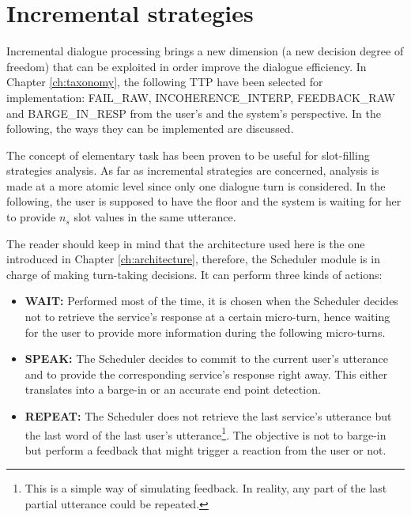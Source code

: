 \section{Incremental strategies}
\label{sec:incrstrat}

     Incremental dialogue processing brings a new dimension (a new decision degree of freedom) that can be exploited in order improve the dialogue efficiency. In Chapter \ref{ch:taxonomy}, the following TTP have been selected for implementation: FAIL\_RAW, INCOHERENCE\_INTERP, FEEDBACK\_RAW and BARGE\_IN\_RESP from the user's and the system's perspective. In the following, the ways they can be implemented are discussed.

     The concept of elementary task has been proven to be useful for slot-filling strategies analysis. As far as incremental strategies are concerned, analysis is made at a more atomic level since only one dialogue turn is considered. In the following, the user is supposed to have the floor and the system is waiting for her to provide $n_s$ slot values in the same utterance.

     The reader should keep in mind that the architecture used here is the one introduced in Chapter \ref{ch:architecture}, therefore, the Scheduler module is in charge of making turn-taking decisions. It can perform three kinds of actions:

     \begin{itemize}
       \item \textbf{WAIT:} Performed most of the time, it is chosen when the Scheduler decides not to retrieve the service's response at a certain micro-turn, hence waiting for the user to provide more information during the following micro-turns.
       \item \textbf{SPEAK:} The Scheduler decides to commit to the current user's utterance and to provide the corresponding service's response right away. This either translates into a barge-in or an accurate end point detection.
       \item \textbf{REPEAT:} The Scheduler does not retrieve the last service's utterance but the last word of the last user's utterance\footnote{This is a simple way of simulating feedback. In reality, any part of the last partial utterance could be repeated.}. The objective is not to barge-in but perform a feedback that might trigger a reaction from the user or not.
     \end{itemize}
		
